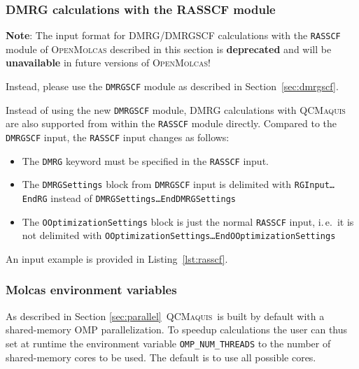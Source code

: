 \documentclass[bibliography=totoc,12pt,a4paper]{scrartcl}
\newcommand{\mol}{\textsc{OpenMolcas}}
\newcommand{\qcm}{\textsc{QCMaquis}}
\newcommand{\kwd}[1]{\texttt{#1}}
\begin{document}
\subsubsection{DMRG calculations with the RASSCF module}

\begin{framed}
  \noindent \textbf{Note}: The input format for DMRG/DMRGSCF calculations with the \kwd{RASSCF} module of \mol{} described in this section is \textbf{deprecated} and will be \textbf{unavailable} in future versions of \mol{}!

  \noindent Instead, please use the \kwd{DMRGSCF} module as described in Section~\ref{sec:dmrgscf}.
\end{framed}


Instead of using the new \kwd{DMRGSCF} module, DMRG calculations with \qcm{} are also supported from within the \kwd{RASSCF} module directly. Compared to the \kwd{DMRGSCF} input, the \kwd{RASSCF} input changes as follows:
\begin{samepage}
  \begin{itemize}
  \item The \kwd{DMRG} keyword must be specified in the \kwd{RASSCF} input.
  \item The \kwd{DMRGSettings} block from \kwd{DMRGSCF} input is delimited with \kwd{RGInput\ldots{}EndRG} instead of \kwd{DMRGSettings\ldots{}EndDMRGSettings}
  \item The \kwd{OOptimizationSettings} block is just the normal \kwd{RASSCF} input, i.\,e.\ it is not delimited with \kwd{OOptimizationSettings\ldots{}EndOOptimizationSettings}
  \end{itemize}
An input example is provided in Listing~\ref{lst:rasscf}.
\end{samepage}

\subsubsection{Molcas environment variables}

\noindent As described in Section \ref{sec:parallel}\ \qcm\ is built by default with a shared-memory
OMP parallelization. To speedup calculations the user can thus set at runtime the environment variable \texttt{OMP\_NUM\_THREADS} to the number of shared-memory cores to be used. The default is to use all possible cores.

\FloatBarrier
\newpage
\end{document}
